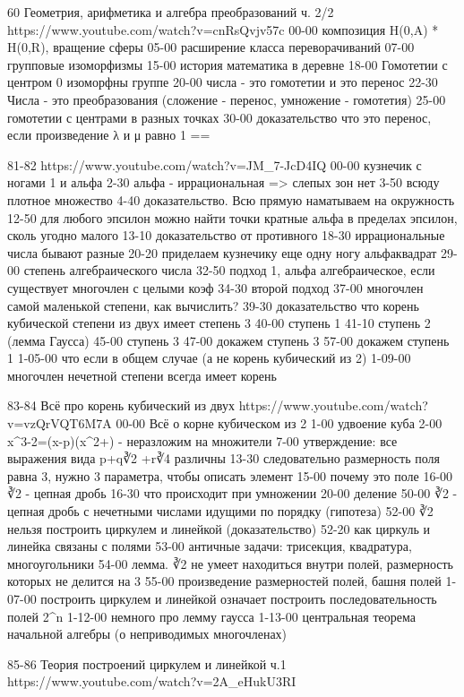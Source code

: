 60
Геометрия, арифметика и алгебра преобразований ч. 2/2
https://www.youtube.com/watch?v=cnRsQvjv57c
00-00 композиция H(0,A) * H(0,R), вращение сферы
05-00 расширение класса переворачиваний
07-00 групповые изоморфизмы
15-00 история математика в деревне
18-00 Гомотетии с центром 0  изоморфны группе
20-00 числа - это гомотетии и это перенос
22-30 Числа - это преобразования (сложение - перенос, умножение - гомотетия)
25-00 гомотетии с центрами в разных точках
30-00 доказательство что это перенос, если произведение λ и μ равно 1
==

81-82
https://www.youtube.com/watch?v=JM_7-JcD4IQ
00-00 кузнечик с ногами 1 и альфа
2-30 альфа - иррациональная => слепых зон нет
3-50 всюду плотное множество
4-40 доказательство. Всю прямую наматываем на окружность
12-50 для любого эпсилон можно найти точки кратные альфа в пределах эпсилон, сколь угодно малого
13-10 доказательство от противного
18-30 иррациональные числа бывают разные
20-20 приделаем кузнечику еще одну ногу альфаквадрат
29-00 степень алгебраического числа
32-50 подход 1, альфа алгебраическое, если существует многочлен с целыми коэф
34-30 второй подход
37-00 многочлен самой маленькой степени, как вычислить?
39-30 доказательство что корень кубической степени из двух имеет степень 3
40-00 ступень 1
41-10 ступень 2 (лемма Гаусса)
45-00 ступень 3
47-00 докажем ступень 3
57-00 докажем ступень 1
1-05-00 что если в общем случае (а не корень кубический из 2)
1-09-00 многочлен нечетной степени всегда имеет корень


83-84
Всё про корень кубический из двух
https://www.youtube.com/watch?v=vzQrVQT6M7A
00-00 Всё о корне кубическом из 2
1-00 удвоение куба
2-00 x^3-2=(x-p)(x^2+) - неразложим на множители
7-00 утверждение: все выражения вида p+q∛2 +r∛4 различны
13-30 следовательно размерность поля равна 3, нужно 3 параметра, чтобы описать элемент
15-00 почему это поле
16-00 ∛2 - цепная дробь
16-30 что происходит при умножении
20-00 деление
50-00 ∛2 - цепная дробь с нечетными числами идущими по порядку (гипотеза)
52-00 ∛2 нельзя построить циркулем и линейкой (доказательство)
52-20 как циркуль и линейка связаны с полями
53-00 античные задачи: трисекция, квадратура, многоугольники
54-00 лемма. ∛2 не умеет находиться внутри полей, размерность которых не делится на 3
55-00 произведение размерностей полей, башня полей
1-07-00 построить циркулем и линейкой означает построить последовательность полей 2^n
1-12-00 немного про лемму гаусса
1-13-00 центральная теорема начальной алгебры (о неприводимых многочленах)

85-86
Теория построений циркулем и линейкой ч.1
https://www.youtube.com/watch?v=2A_eHukU3RI

